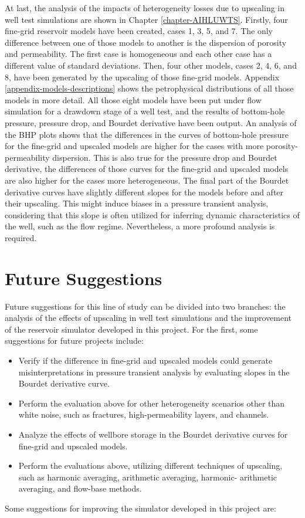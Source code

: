At last, the analysis of the impacts of heterogeneity losses due to upscaling in well test simulations are shown in Chapter \ref{chapter-AIHLUWTS}. 
%
Firstly, four fine-grid reservoir models have been created, cases 1, 3, 5, and 7. 
%
The only difference between one of those models to another is the dispersion of porosity and permeability. 
%
The first case is homogeneous and each other case has a different value of standard deviations. 
%
Then, four other models, cases 2, 4, 6, and 8, have been generated by the upscaling of those fine-grid models. 
%
Appendix \ref{appendix-models-descriptions} shows the petrophysical distributions of all those models in more detail. 
%
All those eight models have been put under flow simulation for a drawdown stage of a well test, and the results of bottom-hole pressure, pressure drop, and Bourdet derivative have been output. 
%
An analysis of the BHP plots shows that the differences in the curves of bottom-hole pressure for the fine-grid and upscaled models are higher for the cases with more porosity-permeability dispersion. 
%
This is also true for the pressure drop and Bourdet derivative, the differences of those curves for the fine-grid and upscaled models are also higher for the cases more heterogeneous. 
%
The final part of the Bourdet derivative curves have slightly different slopes for the models before and after their upscaling. 
%
This might induce biases in a pressure transient analysis, considering that this slope is often utilized for inferring dynamic characteristics of the well, such as the flow regime. 
%
Nevertheless, a more profound analysis is required.

\section{Future Suggestions}

Future suggestions for this line of study can be divided into two branches: the analysis of the effects of upscaling in well test simulations and the improvement of the reservoir simulator developed in this project.
%
For the first, some suggestions for future projects include:
%
\begin{itemize}
	\item Verify if the difference in fine-grid and upscaled models could generate misinterpretations in pressure transient analysis by evaluating slopes in the Bourdet derivative curve. 
	
	\item Perform the evaluation above for other heterogeneity scenarios other than white noise, such as fractures, high-permeability layers, and channels.
	
	\item Analyze the effects of wellbore storage in the Bourdet derivative curves for fine-grid and upscaled models.
	
	\item Perform the evaluations above, utilizing different techniques of upscaling, such as harmonic averaging, arithmetic averaging, harmonic- arithmetic averaging, and flow-base methods.
\end{itemize}
\noindent
%
Some suggestions for improving the simulator developed in this project are:

